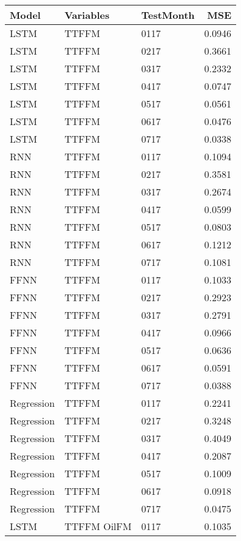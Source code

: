 \begin{table}[h!]
\centering
 \begin{adjustbox}{max width=\textwidth}
\begin{tabular}{lllr}
  \hline
Model & Variables & TestMonth & MSE \\ 
  \hline
LSTM & TTFFM  & 0117 & 0.0946 \\ 
  LSTM & TTFFM  & 0217 & 0.3661 \\ 
  LSTM & TTFFM  & 0317 & 0.2332 \\ 
  LSTM & TTFFM  & 0417 & 0.0747 \\ 
  LSTM & TTFFM  & 0517 & 0.0561 \\ 
  LSTM & TTFFM  & 0617 & 0.0476 \\ 
  LSTM & TTFFM  & 0717 & 0.0338 \\ 
  RNN & TTFFM  & 0117 & 0.1094 \\ 
  RNN & TTFFM  & 0217 & 0.3581 \\ 
  RNN & TTFFM  & 0317 & 0.2674 \\ 
  RNN & TTFFM  & 0417 & 0.0599 \\ 
  RNN & TTFFM  & 0517 & 0.0803 \\ 
  RNN & TTFFM  & 0617 & 0.1212 \\ 
  RNN & TTFFM  & 0717 & 0.1081 \\ 
  FFNN & TTFFM  & 0117 & 0.1033 \\ 
  FFNN & TTFFM  & 0217 & 0.2923 \\ 
  FFNN & TTFFM  & 0317 & 0.2791 \\ 
  FFNN & TTFFM  & 0417 & 0.0966 \\ 
  FFNN & TTFFM  & 0517 & 0.0636 \\ 
  FFNN & TTFFM  & 0617 & 0.0591 \\ 
  FFNN & TTFFM  & 0717 & 0.0388 \\ 
  Regression & TTFFM  & 0117 & 0.2241 \\ 
  Regression & TTFFM  & 0217 & 0.3248 \\ 
  Regression & TTFFM  & 0317 & 0.4049 \\ 
  Regression & TTFFM  & 0417 & 0.2087 \\ 
  Regression & TTFFM  & 0517 & 0.1009 \\ 
  Regression & TTFFM  & 0617 & 0.0918 \\ 
  Regression & TTFFM  & 0717 & 0.0475 \\ 
  LSTM & TTFFM OilFM & 0117 & 0.1035 \\ 

\end{tabular}
\end{adjustbox}
\end{table}
